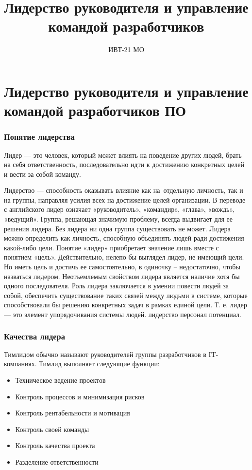\documentclass{../industrial-development}
\title{Лидерство руководителя и управление командой разработчиков}
\author{ ИВТ-21 МО}
\date{}
\begin{document}
\begin{frame}
  \titlepage
\end{frame}

\section{Лидерство руководителя и управление командой разработчиков ПО}

\begin{frame} \frametitle{Понятие лидерства}
 Лидер --- это человек, который может влиять на поведение других людей, брать на себя ответственность, последовательно идти к достижению конкретных целей и вести за собой команду.
\end{frame}

\lecturenotes

Лидерство --- способность оказывать влияние как на~отдельную личность, так и на группы, направляя усилия всех на достижение целей организации. В переводе с английского лидер означает «руководитель», «командир», «глава», «вождь», «ведущий». Группа, решающая значимую проблему, всегда выдвигает для ее решения лидера. Без лидера ни одна группа существовать не может. Лидера можно определить как личность, способную объединять людей ради достижения какой-либо цели. Понятие «лидер» приобретает значение лишь вместе с понятием «цель». Действительно, нелепо бы выглядел лидер, не имеющий цели.
Но иметь цель и достичь ее самостоятельно, в одиночку -- недостаточно, чтобы назваться лидером. Неотъемлемым свойством лидера является наличие хотя бы одного последователя. Роль лидера заключается в умении повести людей за собой, обеспечить существование таких связей между людьми в системе, которые способствовали бы решению конкретных задач в рамках единой цели. Т. е. лидер --- это элемент упорядочивания системы людей. лидерство персонал потенциал.


\begin{frame} \frametitle{Качества лидера}
Тимлидом обычно называют руководителей группы разработчиков в IT-компаниях. Тимлид выполняет следующие функции:

  \begin{itemize}
  \item Техническое ведение проектов
  \item Контроль процессов и минимизация рисков
  \item Контроль рентабельности и мотивация
  \item Контроль своей команды
  \item Контроль качества проекта
  \item Разделение ответственности  
  \end{itemize}
\end{frame}
\end{document}
